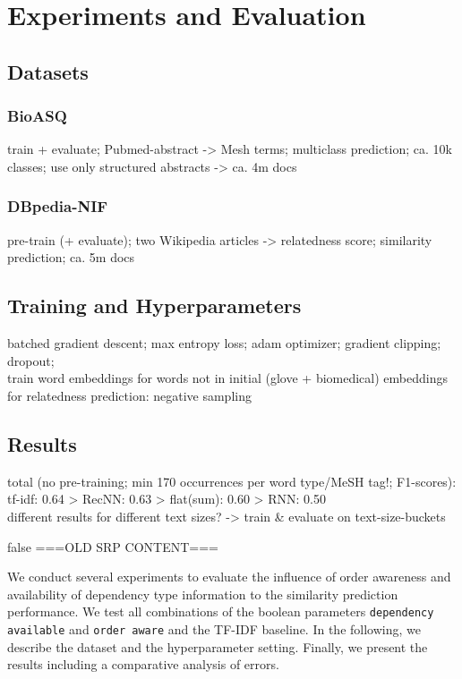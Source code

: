 \section{Experiments and Evaluation}

\subsection{Datasets}

\subsubsection{BioASQ}
train + evaluate; Pubmed-abstract -> Mesh terms; multiclass prediction; ca. 10k classes; use only structured abstracts -> ca. 4m docs

\subsubsection{DBpedia-NIF}
pre-train (+ evaluate); two Wikipedia articles -> relatedness score; similarity prediction; ca. 5m docs

\subsection{Training and Hyperparameters}
batched gradient descent; max entropy loss; adam optimizer; gradient clipping; dropout; \\
train word embeddings for words not in initial (glove + biomedical) embeddings \\
for relatedness prediction: negative sampling 

\subsection{Results}
total (no pre-training; min 170 occurrences per word type/MeSH tag!; F1-scores): \\
tf-idf: 0.64  > RecNN: 0.63 > flat(sum): 0.60 > RNN: 0.50 \\
different results for different text sizes? -> train \& evaluate on text-size-buckets

\if false
===OLD SRP CONTENT===

We conduct several experiments to evaluate the influence of order awareness and availability of dependency type information to the similarity prediction performance. We test all combinations of the boolean parameters \texttt{dependency available} and \texttt{order aware} and the TF-IDF baseline. In the following, we describe the dataset and the hyperparameter setting. Finally, we present the results including a comparative analysis of errors.


